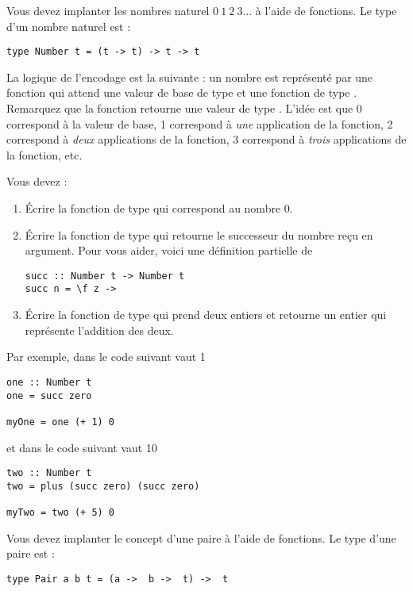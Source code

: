 \begin{Exercise}
\ExePart[title={Nombres naturels}]
\label{sec:nombre_naturel}
Vous devez implanter les nombres naturel $0 \ 1 \ 2 \ 3 \ldots$ à l'aide de
fonctions. Le type d'un nombre naturel est :
\begin{verbatim}
type Number t = (t -> t) -> t -> t
\end{verbatim}

La logique de l'encodage est la suivante : un nombre est représenté
par une fonction qui attend une valeur de base de type 
et une fonction de type . Remarquez que la fonction
retourne une valeur de type . L'idée est que 0
correspond à la valeur de base, 1 correspond à \emph{une} application
de la fonction, 2 correspond à \emph{deux} applications de la fonction,
3 correspond à \emph{trois} applications de la fonction, etc.

Vous devez :
\begin{enumerate}
\item Écrire la fonction  de type  qui correspond au nombre 0.
\item Écrire la fonction  de type 
     qui retourne le successeur du nombre
    reçu en argument. Pour vous aider, voici une définition partielle de 
\begin{verbatim}
succ :: Number t -> Number t
succ n = \f z ->
\end{verbatim}
  \item Écrire la fonction  de type
     qui prend deux
    entiers et retourne un entier qui représente l'addition des deux.
\end{enumerate}

Par exemple, dans le code suivant  vaut 1
\begin{verbatim}
one :: Number t
one = succ zero

myOne = one (+ 1) 0
\end{verbatim}
et dans le code suivant  vaut 10
\begin{verbatim}
two :: Number t
two = plus (succ zero) (succ zero)

myTwo = two (+ 5) 0
\end{verbatim}

\ExePart[title={Paires}]
\label{sec:paires}
Vous devez implanter le concept d'une paire à l'aide de fonctions. Le
type d'une paire est :
\begin{verbatim}
type Pair a b t = (a ->  b ->  t) ->  t
\end{verbatim}


\end{Exercise}
